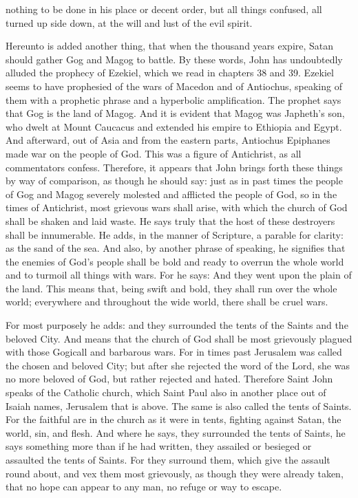 nothing to be done in his place or decent order, but all things confused, all turned up side down, at the will and lust of the evil spirit.

Hereunto is added another thing, that when the thousand years expire, Satan should gather Gog and Magog to battle. By these words, John has undoubtedly alluded the prophecy of Ezekiel, which we read in chapters 38 and 39. Ezekiel seems to have prophesied of the wars of Macedon and of Antiochus, speaking of them with a prophetic phrase and a hyperbolic amplification. The prophet says that Gog is the land of Magog. And it is evident that Magog was Japheth’s son, who dwelt at Mount Caucacus and extended his empire to Ethiopia and Egypt. And afterward, out of Asia and from the eastern parts, Antiochus Epiphanes made war on the people of God. This was a figure of Antichrist, as all commentators confess. Therefore, it appears that John brings forth these things by way of comparison, as though he should say: just as in past times the people of Gog and Magog severely molested and afflicted the people of God, so in the times of Antichrist, most grievous wars shall arise, with which the church of God shall be shaken and laid waste. He says truly that the host of these destroyers shall be innumerable. He adds, in the manner of Scripture, a parable for clarity: as the sand of the sea. And also, by another phrase of speaking, he signifies that the enemies of God’s people shall be bold and ready to overrun the whole world and to turmoil all things with wars. For he says: And they went upon the plain of the land. This means that, being swift and bold, they shall run over the whole world; everywhere and throughout the wide world, there shall be cruel wars.

For most purposely he adds: and they surrounded the tents of the Saints and the beloved City. And means that the church of God shall be most grievously plagued with those Gogicall and barbarous wars. For in times past Jerusalem was called the chosen and beloved City; but after she rejected the word of the Lord, she was no more beloved of God, but rather rejected and hated. Therefore Saint John speaks of the Catholic church, which Saint Paul also in another place out of Isaiah names, Jerusalem that is above. The same is also called the tents of Saints. For the faithful are in the church as it were in tents, fighting against Satan, the world, sin, and flesh. And where he says, they surrounded the tents of Saints, he says something more than if he had written, they assailed or besieged or assaulted the tents of Saints. For they surround them, which give the assault round about, and vex them most grievously, as though they were already taken, that no hope can appear to any man, no refuge or way to escape.

